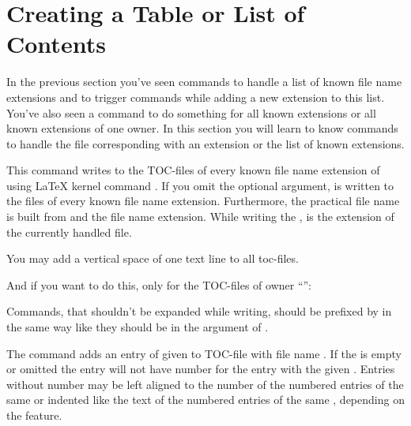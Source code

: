 \section{Creating a Table or List of Contents}
\label{sec:tocbasic.toc}

In the previous section you've seen commands to handle a list of known file
name extensions and to trigger commands while adding a new extension to this
list. You've also seen a command to do something for all known extensions or
all known extensions of one owner. In this section you will learn to know
commands to handle the file corresponding with an extension or the list of
known extensions.

\begin{Declaration}
\end{Declaration}
%
This command writes  to the TOC-files of every known
file name extension of  using \LaTeX{} kernel command
. If you omit the optional argument,  is
written to the files of every known file name extension. Furthermore, the
practical file name is built from  and the file name
extension. While writing the ,
 is the
extension of the currently handled file.
\begin{Example}
  You may add a vertical space of one text line to all toc-files.
\begin{lstcode}
    \addtoeachtocfile{%
      \protect\addvspace{\protect\baselineskip}%
    }
\end{lstcode}
  And if you want to do this, only for the TOC-files of owner
  ``'':
\begin{lstcode}
    \addtoeachtocfile[foo]{%
      \protect\addvspace{\protect\baselineskip}%
    }
\end{lstcode}
\end{Example}
Commands, that shouldn't be expanded while writing, should be prefixed by
 in the same way like they should be in the argument of
.
%

\begin{Declaration}
\end{Declaration}
%
The command  adds an entry of given  to
TOC-file with file name . If the  is empty
or omitted the entry will not have number for the entry with the given
. Entries without number may be left aligned to the number of the
numbered entries of the same  or indented like the text of the
numbered entries of the same , depending on the
 feature.

